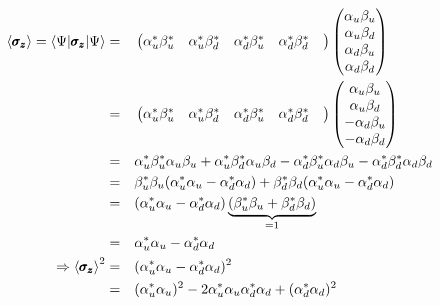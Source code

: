 \documentclass[solutions.tex]{subfiles}
\begin{document}
\begin{equation*}\begin{aligned}
	\left\langle \pmb{\sigma_z} \right\rangle = \langle \Psi|\pmb{\sigma_z}|\Psi\rangle
		&=&& \begin{pmatrix}
			\alpha_u^*\beta_u^* &
			\alpha_u^*\beta_d^* &
			\alpha_d^*\beta_u^* &
			\alpha_d^*\beta_d^* &
		\end{pmatrix}\begin{pmatrix}
			\alpha_u\beta_u \\
			\alpha_u\beta_d \\
			\alpha_d\beta_u \\
			\alpha_d\beta_d \\
		\end{pmatrix} \\
	~ &=&& \begin{pmatrix}
			\alpha_u^*\beta_u^* &
			\alpha_u^*\beta_d^* &
			\alpha_d^*\beta_u^* &
			\alpha_d^*\beta_d^* &
		\end{pmatrix}\begin{pmatrix}
			\alpha_u\beta_u \\
			\alpha_u\beta_d \\
			-\alpha_d\beta_u \\
			-\alpha_d\beta_d \\
		\end{pmatrix} \\
	~ &=&& \alpha_u^*\beta_u^*\alpha_u\beta_u
		+ \alpha_u^*\beta_d^*\alpha_u\beta_d
		- \alpha_d^*\beta_u^*\alpha_d\beta_u
		- \alpha_d^*\beta_d^*\alpha_d\beta_d \\
	~ &=&& \beta_u^*\beta_u(
			\alpha_u^*\alpha_u -\alpha_d^*\alpha_d
		) + \beta_d^*\beta_d(
			\alpha_u^*\alpha_u -\alpha_d^*\alpha_d
		) \\
	~ &=&& (\alpha_u^*\alpha_u -\alpha_d^*\alpha_d)\underbrace{(
		\beta_u^*\beta_u + \beta_d^*\beta_d
	)}_{=1} \\
	~ &=&& 	\alpha_u^*\alpha_u -\alpha_d^*\alpha_d \\
	\Rightarrow\left\langle \pmb{\sigma_z} \right\rangle^2 &=&&
		(\alpha_u^*\alpha_u -\alpha_d^*\alpha_d)^2 \\
	~ &=&& (\alpha_u^*\alpha_u)^2 -2\alpha_u^*\alpha_u\alpha_d^*\alpha_d
		+(\alpha_d^*\alpha_d)^2 \\
\end{aligned}\end{equation*}
\end{document}
